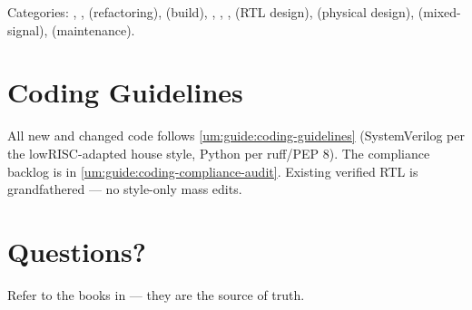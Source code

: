 Categories: \code{[Fix]}, \code{[Feature]}, \code{[Code]} (refactoring),
\code{[Env]} (build), \code{[Doc]}, \code{[Test]}, \code{[Spec]},
\code{[RTL]} (RTL design), \code{[PD]} (physical design),
\code{[Analog]} (mixed-signal), \code{[Chore]} (maintenance).

\section{Coding Guidelines}\label{um:guide:commit-and-coding-rules:coding-guidelines}

All new and changed code follows \cref{um:guide:coding-guidelines} (SystemVerilog per the lowRISC-adapted house style, Python per ruff/PEP 8).
The compliance backlog is in \cref{um:guide:coding-compliance-audit}.
Existing verified RTL is grandfathered --- no style-only mass edits.

\section{Questions?}\label{um:guide:commit-and-coding-rules:questions}

Refer to the books in  --- they are the source of truth.
